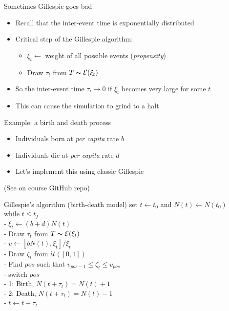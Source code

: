\documentclass[aspectratio=169]{beamer}\usepackage[]{graphicx}\usepackage[]{xcolor}
\begin{document}
\begin{frame}{Sometimes Gillespie goes bad}
    \begin{itemize}
        \item Recall that the inter-event time is exponentially distributed
        \item Critical step of the Gillespie algorithm:
        \begin{itemize}
            \item $\xi_t\leftarrow$ weight of all possible events (\emph{propensity})
            \item Draw $\tau_t$ from $T\thicksim \mathcal{E}(\xi_t)$
        \end{itemize}
        \item So the inter-event time $\tau_t\to 0$ if $\xi_t$ becomes very large for some $t$
        \item This can cause the simulation to grind to a halt
    \end{itemize}
\end{frame}


\begin{frame}{Example: a birth and death process}
    \begin{itemize}
        \item Individuals born at \emph{per capita} rate $b$
        \item Individuals die at \emph{per capita} rate $d$
        \item Let's implement this using classic Gillespie
    \end{itemize}
    \vfill
(See \href{https://raw.githubusercontent.com/julien-arino/3MC-course-epidemiological-modelling/main/CODE/simulate_birth_death_CTMC.R}{} on course GitHub repo)
\end{frame}


\begin{frame}{Gillespie's algorithm (birth-death model)}
set $t\leftarrow t_0$ and $N(t)\leftarrow N(t_0)$\\
while {$t\leq t_f$}\\
- $\xi_t\leftarrow (b+d)N(t)$\\
- Draw $\tau_t$ from $T\thicksim \mathcal{E}(\xi_t)$\\
- $v\leftarrow\left[bN(t),\xi_t\right]/\xi_t$\\
- Draw $\zeta_t$ from $\mathcal{U}([0,1])$\\
- Find $pos$ such that $v_{pos-1}\leq\zeta_t\leq v_{pos}$\\
- switch {$pos$}\\
\qquad - 1: Birth, $N(t+\tau_t)=N(t)+1$ \\
\qquad - 2: Death, $N(t+\tau_t)=N(t)-1$ \\
- $t\leftarrow t+\tau_t$    
\end{frame}
\end{document}
